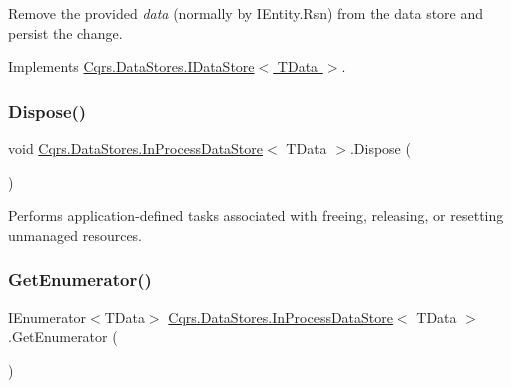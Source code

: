 Remove the provided {\itshape data}  (normally by I\+Entity.\+Rsn) from the data store and persist the change. 



Implements \hyperlink{interfaceCqrs_1_1DataStores_1_1IDataStore_aa7ade96f2f3151d5353cf7bdbb2baec5_aa7ade96f2f3151d5353cf7bdbb2baec5}{Cqrs.\+Data\+Stores.\+I\+Data\+Store$<$ T\+Data $>$}.

\mbox{\label{classCqrs_1_1DataStores_1_1InProcessDataStore_a220126a1dd0e318197b9c994c313d5fd_a220126a1dd0e318197b9c994c313d5fd}} 
\subsubsection{\texorpdfstring{Dispose()}{Dispose()}}
{\footnotesize\ttfamily void \hyperlink{classCqrs_1_1DataStores_1_1InProcessDataStore}{Cqrs.\+Data\+Stores.\+In\+Process\+Data\+Store}$<$ T\+Data $>$.Dispose (\begin{DoxyParamCaption}{ }\end{DoxyParamCaption})}



Performs application-\/defined tasks associated with freeing, releasing, or resetting unmanaged resources. 

\mbox{\label{classCqrs_1_1DataStores_1_1InProcessDataStore_a867c2badec9f0669cf70257f5572b701_a867c2badec9f0669cf70257f5572b701}} 
\subsubsection{\texorpdfstring{Get\+Enumerator()}{GetEnumerator()}}
{\footnotesize\ttfamily I\+Enumerator$<$T\+Data$>$ \hyperlink{classCqrs_1_1DataStores_1_1InProcessDataStore}{Cqrs.\+Data\+Stores.\+In\+Process\+Data\+Store}$<$ T\+Data $>$.Get\+Enumerator (\begin{DoxyParamCaption}{ }\end{DoxyParamCaption})}



